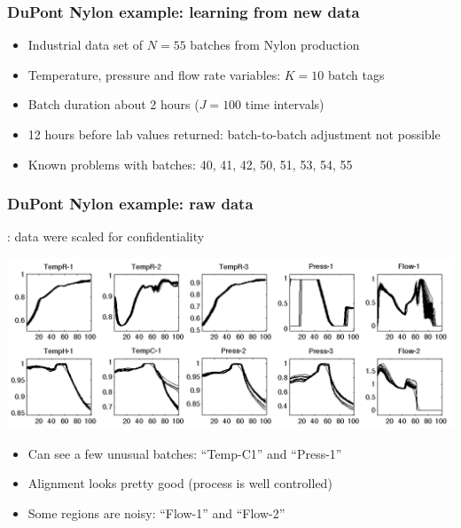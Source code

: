 \documentclass[handout, 12pt]{beamer}
\begin{document}
\begin{frame}\frametitle{DuPont Nylon example: learning from new data}

	\begin{itemize}
		\item	Industrial data set of \( N = 55 \) batches from Nylon production
		
		\item	Temperature, pressure and flow rate variables: \( K = 10\)  batch tags
		
		\item	Batch duration about 2 hours (\( J=100 \) time intervals)
		
		\item	12 hours before lab values returned: batch-to-batch adjustment not possible
		
		\item	Known problems with batches: 40, 41, 42, 50, 51, 53, 54, 55
	\end{itemize}
	
	
\end{frame}

\begin{frame}\frametitle{DuPont Nylon example: raw data}
	{\color{myGreen}{Note}}: data were scaled for confidentiality
	\begin{center}
		\includegraphics[width=\textwidth]{images/dupont/dupont-raw-data-trajectories.png}
	\end{center}
	
	\vspace{1cm}
	\begin{itemize}
		\item	Can see a few unusual batches: ``Temp-C1'' and ``Press-1''
		
		\item	Alignment looks pretty good (process is well controlled)
		
		\item	Some regions are noisy: ``Flow-1'' and ``Flow-2''
	\end{itemize}

\end{frame}
\end{document}
